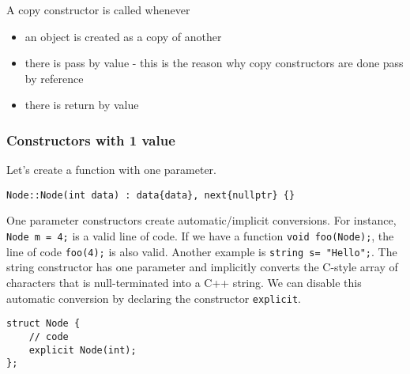 \documentclass[12pt]{article}
\begin{document}
A copy constructor is called whenever
\begin{itemize}
    \item an object is created as a copy of another
    \item there is pass by value - this is the reason why copy constructors are done pass by reference
    \item there is return by value
\end{itemize}

\subsubsection{Constructors with 1 value}
Let's create a function with one parameter.
\begin{lstlisting}
Node::Node(int data) : data{data}, next{nullptr} {}
\end{lstlisting}
One parameter constructors create automatic/implicit conversions. For instance, \lstinline{Node m = 4;} is a valid line of code. If we have a function \lstinline{void foo(Node);}, the line of code \lstinline{foo(4);} is also valid. Another example is \lstinline{string s= "Hello";}. The string constructor has one parameter and implicitly converts the C-style array of characters that is null-terminated into a C++ string. We can disable this automatic conversion by declaring the constructor \lstinline{explicit}.
\begin{lstlisting}
struct Node {
    // code
    explicit Node(int);
};
\end{lstlisting}
\end{document}
